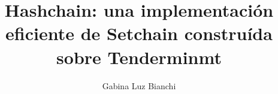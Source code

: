 \documentclass{book}
\title{Hashchain: una implementación eficiente de Setchain construída sobre Tenderminmt}
\author{Gabina Luz Bianchi}
\begin{document}
\maketitle

\tableofcontents{}





% 


% 






% 


% 


% 


% 


% 



% 
\end{document}
